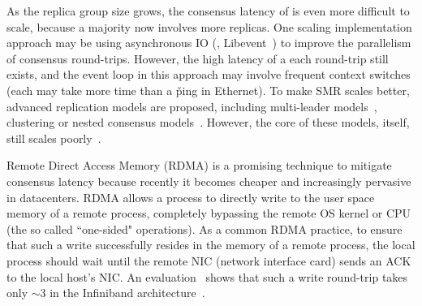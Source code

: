 As the replica group size grows, the consensus latency of \paxos is even more 
difficult to scale, because a majority now involves more replicas. One 
scaling implementation approach may be using asynchronous IO (\eg, 
Libevent~\cite{libevent}) to improve the parallelism of consensus round-trips. 
However, the high latency of a each round-trip still exists, and the event loop 
in this approach may involve frequent context switches (each may take more time 
than a \v{ping} in Ethernet). To make SMR scales better, advanced replication 
models are proposed, including multi-leader 
models~\cite{epaxos:sosp13,mencius:osdi08}, clustering or nested consensus 
models~\cite{scatter:sosp11,manos:hotdep10}. However, the core of these models, 
\paxos itself, still scales poorly~\cite{ellis:thesis}.




Remote Direct Access Memory (RDMA) is a promising technique to mitigate 
consensus latency because recently it becomes cheaper and increasingly 
pervasive in datacenters. RDMA allows a process to directly write to the 
user space memory of a remote process, completely bypassing the remote OS 
kernel or CPU (the so called ``one-sided" operations). As a common 
RDMA practice, to ensure that such a write successfully resides in the 
memory of a remote process, the local process should wait until the remote NIC 
(network interface card) sends an ACK to the local host's NIC. An 
evaluation~\cite{pilaf:usenix14} shows that such a write round-trip takes only 
$\sim$3 \us in the Infiniband architecture~\cite{infiniband}.

